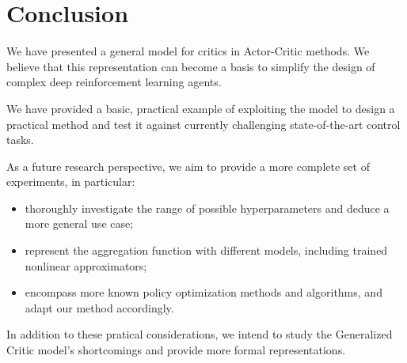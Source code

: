\section{Conclusion}
\label{sec:conc}
We have presented a general model for critics in Actor-Critic methods. We believe that this representation can become a basis to simplify the design of complex deep reinforcement learning agents.

We have provided a basic, practical example of exploiting the model to design a practical method and test it against currently challenging state-of-the-art control tasks.

As a future research perspective, we aim to provide a more complete set of experiments, in particular: 
\begin{itemize}
\item thoroughly investigate the range of possible hyperparameters and deduce a more general use case;
\item represent the aggregation function with different models, including trained nonlinear approximators;
\item encompass more known policy optimization methods and algorithms, and adapt our method accordingly.
\end{itemize}

In addition to these pratical considerations, we intend to study the Generalized Critic model's shortcomings and provide more formal representations.


